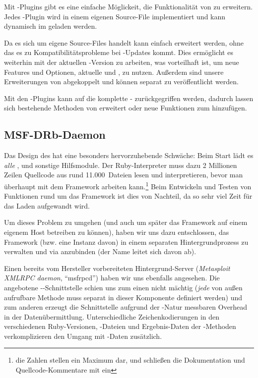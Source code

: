 Mit -Plugins gibt es eine einfache Möglickeit, die
Funktionalität von  zu erweitern. Jedes
-Plugin wird in einem eigenen Source-File implementiert und kann
dynamisch im  geladen werden.

Da es sich um eigene Source-Files handelt kann  einfach erweitert werden, ohne
das es zu Kompatibilitätsprobleme bei -Updates kommt. Dies ermöglicht es
weiterhin mit der aktuellen -Version zu arbeiten, was vorteilhaft ist,
um neue Features und Optionen, \zB aktuelle  und , zu nutzen.
Außerdem sind unsere Erweiterungen von  abgekoppelt und können
separat zu  veröffentlicht werden.

Mit den -Plugins kann auf die komplette -
zurückgegriffen werden, dadurch lassen sich bestehende Methoden von  erweitert oder neue Funktionen zum  hinzufügen.

\subsection{MSF-DRb-Daemon}
\label{sub_sec:msfdrbd}
\authors{\DM}{\LM \and \MW}

Das Design des  hat eine besonders hervorzuhebende Schwäche: Beim
Start lädt es \textit{alle} ,  und sonstige Hilfsmodule.
Der Ruby-Interpreter muss dazu 2 Millionen Zeilen Quellcode aus rund
11.000~Dateien lesen und interpretieren, bevor man überhaupt mit dem Framework
arbeiten kann.\footnote{die Zahlen stellen ein Maximum dar, und schließen \uA
die Dokumentation und Quellcode-Kommentare mit ein} Beim Entwickeln und Testen
von Funktionen rund um das Framework ist dies von Nachteil, da so sehr viel
Zeit für das Laden aufgewandt wird.

Um dieses Problem zu umgehen (und auch um später das Framework auf einem
eigenem Host betreiben zu können), haben wir uns dazu entschlossen, das
Framework (bzw. eine Instanz davon) in einem separaten Hintergrundprozess zu
verwalten und via  anzubinden (der Name  leitet sich
davon ab).

Einen bereits vom Hersteller vorbereiteten Hintergrund-Server (\textit{Metasploit
XMLRPC daemon}, \enquote{msfrpcd}) haben wir uns ebenfalls angesehen. Die
angebotene --Schnittstelle schien uns zum einen nicht mächtig
(\textit{jede} von außen aufrufbare Methode muss separat in dieser Komponente
definiert werden) und zum anderen erzeugt die Schnittstelle aufgrund der
-Natur messbaren Overhead in der Datenübermittlung. Unterschiedliche
Zeichenkodierungen in den verschiedenen Ruby-Versionen, -Dateien und
Ergebnis-Daten der -Methoden verkomplizieren den Umgang mit -Daten
zusätzlich.

